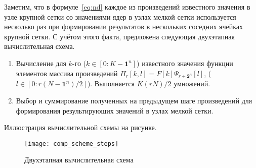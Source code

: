 Заметим, 
что в формуле~\eqref{eq:nd} каждое из произведений известного значения в узле крупной сетки
со значениями ядер в узлах мелкой сетки используется несколько раз
при формировании результатов в нескольких соседних
ячейках 
крупной сетки. 
С учётом этого факта,
предложена следующая двухэтапная вычислительная схема.
\begin{enumerate}
\item
  Вычисление для $k$-го ($k \in [0:K-\mathbf{1}^n]$)
  известного значения функции 
  элементов массива произведений
  $\Pi_r[k,l] = F[k]\Psi_{r+\mathbf{2}^n}[l]$,
  ($l \in [0:r(N-\mathbf{1}^n)/2]$).
  Выполняется $\overline{K(rN)/2}$ умножений.
  

\item
  Выбор и суммирование полученных на предыдущем шаге произведений
  для формирования результирующих значений в узлах мелкой сетки.
\end{enumerate}




Иллюстрация вычислительной схемы на рисунке.
\begin{figure}[h!]
  \centering
  \texttt{[image: comp\_scheme\_steps]} 
  \caption{Двухэтапная вычислительная схема}
  \label{fig:reg_net}
\end{figure}
\FloatBarrier


